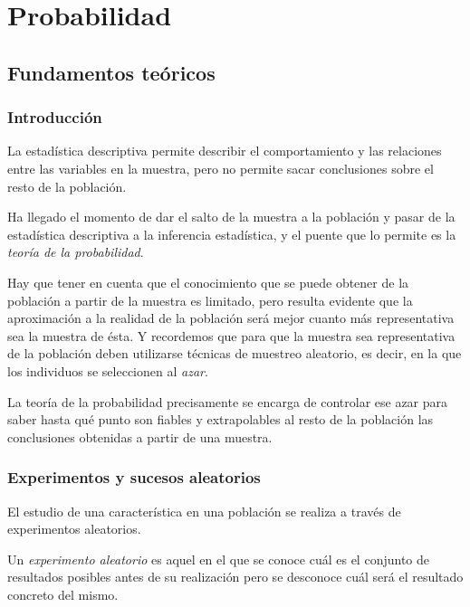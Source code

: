 
\chapter{Probabilidad}

\section{Fundamentos teóricos}
\subsection{Introducción}
La estadística descriptiva permite describir el comportamiento y las relaciones entre las variables en la muestra, pero no permite sacar
conclusiones sobre el resto de la población.

Ha llegado el momento de dar el salto de la muestra a la población y pasar de la estadística descriptiva a la inferencia estadística, y el 
puente que lo permite es la \emph{teoría de la probabilidad}.

Hay que tener en cuenta que el conocimiento que se puede obtener de la población a partir de la muestra es limitado, pero resulta evidente
que la aproximación a la realidad de la población será mejor cuanto más representativa sea la muestra de ésta.
Y recordemos que para que la muestra sea representativa de la población deben utilizarse técnicas de muestreo aleatorio, es decir, en la que
los individuos se seleccionen al \emph{azar}.

La teoría de la probabilidad precisamente se encarga de controlar ese azar para saber hasta qué punto son fiables y extrapolables al
resto de la población las conclusiones obtenidas a partir de una muestra.

\subsection{Experimentos y sucesos aleatorios}
El estudio de una característica en una población se realiza a través de experimentos aleatorios.

\begin{definicion} Un \emph{experimento aleatorio} es aquel en el que se conoce cuál es el conjunto de resultados
posibles antes de su realización pero se desconoce cuál será el resultado concreto del mismo.
\end{definicion}

